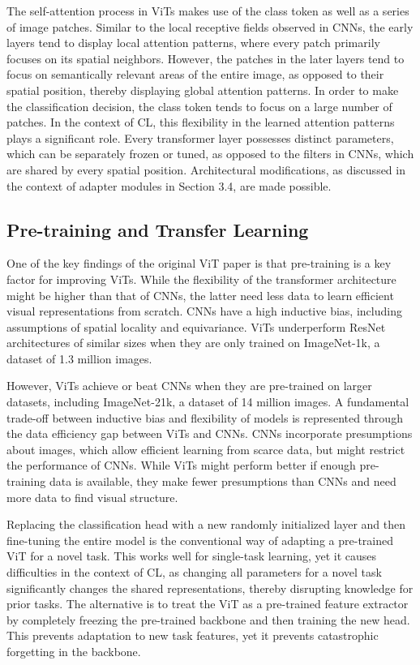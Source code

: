 \documentclass[english, LaM, oneside]{sapthesis}%
\numberwithin{equation}{chapter}
\begin{document}
The self-attention process in ViTs makes use of the class token as well as a series of image patches. Similar to the local receptive fields observed in CNNs, the early layers tend to display local attention patterns, where every patch primarily focuses on its spatial neighbors. However, the patches in the later layers tend to focus on semantically relevant areas of the entire image, as opposed to their spatial position, thereby displaying global attention patterns. In order to make the classification decision, the class token tends to focus on a large number of patches. In the context of CL, this flexibility in the learned attention patterns plays a significant role. Every transformer layer possesses distinct parameters, which can be separately frozen or tuned, as opposed to the filters in CNNs, which are shared by every spatial position. Architectural modifications, as discussed in the context of adapter modules in Section 3.4, are made possible.

\subsection{Pre-training and Transfer Learning}
One of the key findings of the original ViT paper\cite{4} is that pre-training is a key factor for improving ViTs. While the flexibility of the transformer architecture might be higher than that of CNNs, the latter need less data to learn efficient visual representations from scratch.  CNNs have a high inductive bias, including assumptions of spatial locality and equivariance. ViTs underperform ResNet architectures of similar sizes when they are only trained on ImageNet-1k, a dataset of 1.3 million images\cite{4}. 

However, ViTs achieve or beat CNNs when they are pre-trained on larger datasets, including ImageNet-21k, a dataset of 14 million images.
A fundamental trade-off between inductive bias and flexibility of models is represented through the data efficiency gap between ViTs and CNNs. CNNs incorporate presumptions about images, which allow efficient learning from scarce data, but might restrict the performance of CNNs. While ViTs might perform better if enough pre-training data is available, they make fewer presumptions than CNNs and need more data to find visual structure.

Replacing the classification head with a new randomly initialized layer and then fine-tuning the entire model is the conventional way of adapting a pre-trained ViT for a novel task\cite{30}. This works well for single-task learning, yet it causes difficulties in the context of CL, as changing all parameters for a novel task significantly changes the shared representations, thereby disrupting knowledge for prior tasks. The alternative is to treat the ViT as a pre-trained feature extractor by completely freezing the pre-trained backbone and then training the new head. This prevents adaptation to new task features, yet it prevents catastrophic forgetting in the backbone.
\end{document}

